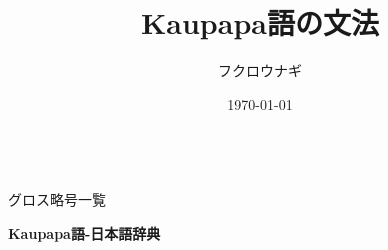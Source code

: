 \documentclass[uplatex, a4paper]{jsarticle}
\title{\textbf{Kaupapa語の文法}}
\author{
    フクロウナギ
    }
\date{\today}
\begin{document}
\maketitle
\newpage

\tableofcontents
　\\
グロス略号一覧\\
\printglossaries
\newpage


\newpage

\pagestyle{empty}
\begin{center}
    \vspace*{\fill}
    \Huge \textbf{Kaupapa語-日本語辞典}
    \vspace*{\fill}
\end{center}
\newpage

\pagestyle{plain} 

\end{document}
